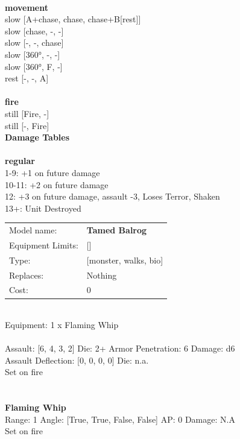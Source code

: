\ \\ {\bf movement } \\
slow [A+chase, chase, chase+B[rest]] \\
slow [chase, -, -] \\
slow [-, -, chase] \\
slow [360°, -, -] \\
slow [360°, F, -] \\
rest [-, -, A] \\
\ \\ {\bf fire } \\
still [Fire, -] \\
still [-, Fire] \\


{\bf Damage Tables} \\
\ \\ {\bf regular } \\
1-9: +1 on future damage \\
10-11: +2 on future damage \\
12: +3 on future damage, assault -3, Loses Terror, Shaken \\
13+: Unit Destroyed \\


\noindent
\begin{tabular}{ll}
Model name: &{\bf Tamed Balrog } \\
Equipment Limits: &[] \\
Type: &[monster, walks, bio] \\
Replaces: &Nothing \\
Cost: & 0\\
\end{tabular}
\ \\
Equipment: 1 x Flaming Whip \\
\ \\
Assault: [6, 4, 3, 2] Die: 2+ Armor Penetration: 6 Damage: d6 \\
Assault Deflection: [0, 0, 0, 0] Die: n.a.\\
\indent Set on fire\\ 
 
\ \\

\ \\
{\bf Flaming Whip } \\



Range: 1  Angle: [True, True, False, False] AP: 0 Damage: N.A \\
Set on fire\\ 




